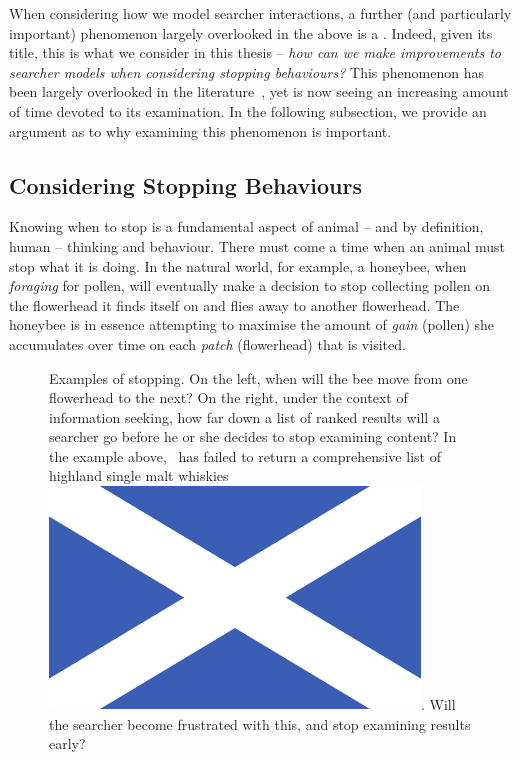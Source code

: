 When considering how we model searcher interactions, a further (and particularly important) phenomenon largely overlooked in the above is a . Indeed, given its title, this is what we consider in this thesis -- \emph{how can we make improvements to searcher models when considering stopping behaviours?} This phenomenon has been largely overlooked in the literature~\citep{maxwell2015stopping_strategies}, yet is now seeing an increasing amount of time devoted to its examination. In the following subsection, we provide an argument as to why examining this phenomenon is important.

\subsection{Considering Stopping Behaviours}
Knowing when to stop is a fundamental aspect of animal -- and by definition, human -- thinking and behaviour. There must come a time when an animal must stop what it is doing. In the natural world, for example, a honeybee, when \emph{foraging} for pollen, will eventually make a decision to stop collecting pollen on the flowerhead it finds itself on and flies away to another flowerhead. The honeybee is in essence attempting to maximise the amount of \emph{gain} (pollen) she accumulates over time on each \emph{patch} (flowerhead) that is visited.

\begin{figure}[t!]
    \centering
    \caption[Animal and searcher stopping examples]{Examples of stopping. On the left, when will the bee move from one flowerhead to the next? On the right, under the context of information seeking, how far down a list of ranked results will a searcher go before he or she decides to stop examining content? In the example above, \searchlogo~has failed to return a comprehensive list of highland single malt whiskies~\includegraphics[height=\fontcharht\font`\d]{figures/ch0-saltire.pdf}. Will the searcher become frustrated with this, and stop examining results early?}
    \label{fig:ch1-stopping}
\end{figure}

